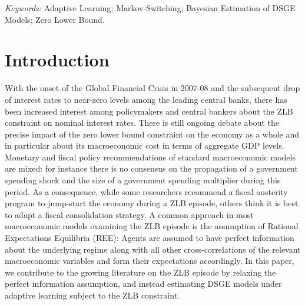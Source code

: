 \documentclass[12pt,reqno]{article}
\numberwithin{equation}{section}
\begin{document}
\noindent
\textit{Keywords:} Adaptive Learning; Markov-Switching; Bayesian Estimation of DSGE Models; Zero Lower Bound. 

\newpage

\section{Introduction}

With the onset of the Global Financial Crisis in 2007-08 and the subsequent drop of interest rates to near-zero levels among the leading central banks, there has been increased interest among policymakers and central bankers about the ZLB constraint on nominal interest rates. There is still ongoing debate about the precise impact of the zero lower bound constraint on the economy as a whole and in particular about its macroeconomic cost in terms of aggregate GDP levels. Monetary and fiscal policy recommendations of standard macroeconomic models are mixed: for instance there is no consensus on the propagation of a government spending shock and the size of a government spending multiplier during this period. As a consequence, while some researchers recommend a fiscal austerity program to jump-start the economy during a ZLB episode, others think it is best to adapt a fiscal consolidation strategy. A common approach in most macroeconomic models examining the ZLB episode is the assumption of Rational Expectations Equilibria (REE): Agents are assumed to have perfect information about the underlying regime along with all other cross-correlations of the relevant macroeconomic variables and form their expectations accordingly. In this paper, we contribute to the growing literature on the ZLB episode by relaxing the perfect information assumption, and instead estimating DSGE models under adaptive learning subject to the ZLB constraint. 
\end{document}

